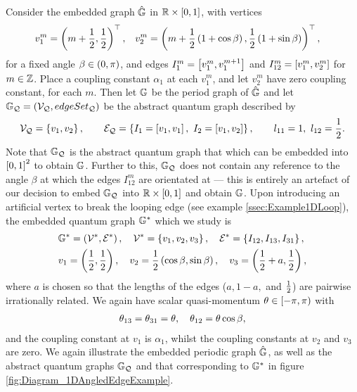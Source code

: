 Consider the embedded graph $\hat{\mathbb{G}}$ in $\mathbb{R}\times\left[ 0,1 \right]$, with vertices
\begin{align*}
	v_1^m = \left( m + \frac{1}{2}, \frac{1}{2} \right)^\top, 
	&\quad v_2^m = \left( m + \frac{1}{2}\left( 1+\cos\beta \right), \frac{1}{2}\left( 1+\sin\beta \right) \right)^\top,
\end{align*}
for a fixed angle $\beta\in\left( 0,\pi \right)$, and edges $I_{1}^{m} = \left[ v_1^m, v_1^{m+1} \right]$ and $I_{12}^m=\left[ v_1^m, v_2^m \right]$ for $m\in\mathbb{Z}$.
Place a coupling constant $\alpha_1$ at each $v_1^m$, and let $v_2^m$ have zero coupling constant, for each $m$.
Then let $\mathbb{G}$ be the period graph of $\hat{\mathbb{G}}$ and let $\mathbb{G}_{\mathcal{Q}}=\left( \mathcal{V}_{\mathcal{Q}}, edgeSet_{\mathcal{Q}} \right)$ be the abstract quantum graph described by
\begin{align*}
	\vertSet_{\mathcal{Q}} = \clbracs{v_1, v_2},
	\qquad
	\edgeSet_{\mathcal{Q}} = \clbracs{ I_1=\sqbracs{v_1,v_1}, \ I_2=\sqbracs{v_1,v_2} },
	\qquad
	l_{11} = 1, \ l_{12} = \recip{2}.
\end{align*}
Note that $\mathbb{G}_{\mathcal{Q}}$ is the abstract quantum graph that which can be embedded into $\left[ 0,1 \right]^2$ to obtain $\mathbb{G}$.
Further to this, $\mathbb{G}_{\mathcal{Q}}$ does not contain any reference to the angle $\beta$ at which the edges $I^m_{12}$ are orientated at --- this is entirely an artefact of our decision to embed $\mathbb{G}_{\mathcal{Q}}$ into $\mathbb{R}\times\left[ 0,1 \right]$ and obtain $\mathbb{G}$.
Upon introducing an artificial vertex to break the looping edge (see example \ref{ssec:Example1DLoop}), the embedded quantum graph $\mathbb{G}^*$ which we study is
\begin{align*}
	&\mathbb{G}^* = \left( \mathcal{V}^*, \mathcal{E}^* \right), \quad
	\mathcal{V}^* = \left\{  v_1, v_2, v_3  \right\}, \quad
	\mathcal{E}^* = \left\{  I_{12}, I_{13}, I_{31}  \right\}, \\
	&v_1 = \left( \frac{1}{2},\frac{1}{2} \right), \quad
	v_2 = \frac{1}{2}\left( \cos\beta, \sin\beta \right), \quad
	v_3 = \left( \frac{1}{2}+a, \frac{1}{2} \right),
\end{align*}
where $a$ is chosen so that the lengths of the edges ($a, 1-a,$ and $\frac{1}{2}$) are pairwise irrationally related.
We again have scalar quasi-momentum $\theta\in\left[-\pi,\pi\right)$ with
\begin{align*}
	\theta_{13} = \theta_{31} = \theta, \quad \theta_{12} = \theta\cos\beta,
\end{align*}
and the coupling constant at $v_1$ is $\alpha_1$, whilst the coupling constants at $v_2$ and $v_3$ are zero.
We again illustrate the embedded periodic graph $\hat{\mathbb{G}}$, as well as the abstract quantum graphs $\mathbb{G}_{\mathcal{Q}}$ and that corresponding to $\mathbb{G}^*$ in figure \ref{fig:Diagram_1DAngledEdgeExample}.
